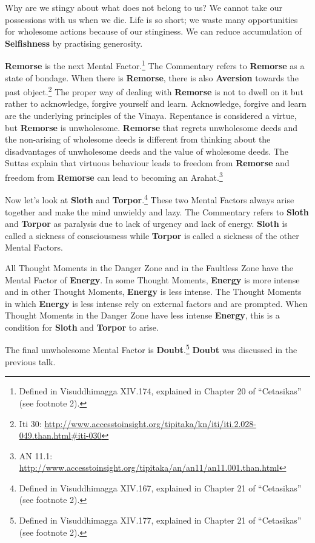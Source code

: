 Why are we stingy about what does not belong to us? We cannot take our possessions with us when we die. Life is so short; we waste many opportunities for wholesome actions because of our stinginess. We can reduce accumulation of \textbf{Selfishness} by practising generosity.

\textbf{Remorse} is the next Mental Factor.\footnote{Defined in Visuddhimagga XIV.174, explained in Chapter 20 of “Cetasikas” (see footnote 2).} The Commentary refers to \textbf{Remorse} as a state of bondage. When there is \textbf{Remorse}, there is also \textbf{Aversion} towards the past object.\footnote{Iti 30: \url{http://www.accesstoinsight.org/tipitaka/kn/iti/iti.2.028-049.than.html\#iti-030}} The proper way of dealing with \textbf{Remorse} is not to dwell on it but rather to acknowledge, forgive yourself and learn. Acknowledge, forgive and learn are the underlying principles of the Vinaya. Repentance is considered a virtue, but \textbf{Remorse} is unwholesome. \textbf{Remorse} that regrets unwholesome deeds and the non-arising of wholesome deeds is different from thinking about the disadvantages of unwholesome deeds and the value of wholesome deeds. The Suttas explain that virtuous behaviour leads to freedom from \textbf{Remorse} and freedom from \textbf{Remorse} can lead to becoming an Arahat.\footnote{AN 11.1: \url{http://www.accesstoinsight.org/tipitaka/an/an11/an11.001.than.html}}

Now let’s look at \textbf{Sloth} and \textbf{Torpor}.\footnote{Defined in Visuddhimagga XIV.167, explained in Chapter 21 of “Cetasikas” (see footnote 2).} These two Mental Factors always arise together and make the mind unwieldy and lazy. The Commentary refers to \textbf{Sloth} and \textbf{Torpor} as paralysis due to lack of urgency and lack of energy. \textbf{Sloth} is called a sickness of consciousness while \textbf{Torpor} is called a sickness of the other Mental Factors.

All Thought Moments in the Danger Zone and in the Faultless Zone have the Mental Factor of \textbf{Energy}. In some Thought Moments, \textbf{Energy} is more intense and in other Thought Moments, \textbf{Energy} is less intense. The Thought Moments in which \textbf{Energy} is less intense rely on external factors and are prompted. When Thought Moments in the Danger Zone have less intense \textbf{Energy}, this is a condition for \textbf{Sloth} and \textbf{Torpor} to arise.

The final unwholesome Mental Factor is \textbf{Doubt}.\footnote{Defined in Visuddhimagga XIV.177, explained in Chapter 21 of “Cetasikas” (see footnote 2).} \textbf{Doubt} was discussed in the previous talk.

